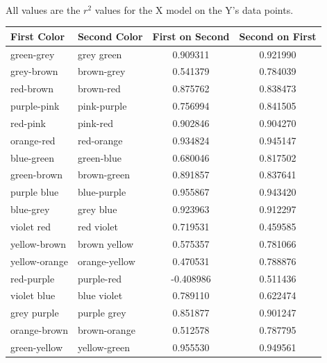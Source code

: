 \documentclass[12pt, letterpaper]{article}
\begin{document}
\paragraph{}All values are the $ r^2$ values for the X model on the Y's data points.
\begin{center}
\begin{tabular}{| l | l | c | c |} \hline
First Color & Second Color & First on Second & Second on First \\ \hline
green-grey & grey green & 0.909311 & 0.921990 \\ \hline
grey-brown & brown-grey & 0.541379 & 0.784039 \\ \hline
red-brown & brown-red & 0.875762 & 0.838473 \\ \hline
purple-pink & pink-purple & 0.756994 & 0.841505 \\ \hline
red-pink & pink-red & 0.902846 & 0.904270 \\ \hline
orange-red & red-orange & 0.934824 & 0.945147 \\ \hline
blue-green & green-blue & 0.680046 & 0.817502 \\ \hline
green-brown & brown-green & 0.891857 & 0.837641 \\ \hline
purple blue & blue-purple & 0.955867 & 0.943420 \\ \hline
blue-grey & grey blue & 0.923963 & 0.912297 \\ \hline
violet red & red violet & 0.719531 & 0.459585 \\ \hline
yellow-brown & brown yellow & 0.575357 & 0.781066 \\ \hline
yellow-orange & orange-yellow & 0.470531 & 0.788876 \\ \hline
red-purple & purple-red & -0.408986 & 0.511436 \\ \hline
violet blue & blue violet & 0.789110 & 0.622474 \\ \hline
grey purple & purple grey & 0.851877 & 0.901247 \\ \hline
orange-brown & brown-orange & 0.512578 & 0.787795 \\ \hline
green-yellow & yellow-green & 0.955530 & 0.949561 \\ \hline
\end{tabular}


\end{center}
\end{document}
